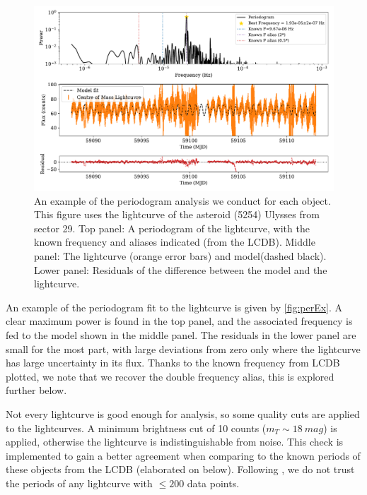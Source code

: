 \documentclass[12pt]{article}
\begin{document}
\begin{figure}[!t]
    \centering
    \includegraphics[width=\textwidth]{PeriodogramUlyssesPaperFigDraft.pdf}
    \caption{An example of the periodogram analysis we conduct for each object.
        This figure uses the lightcurve of the asteroid (5254) Ulysses from sector 29.
        Top panel: A periodogram of the lightcurve, with the known frequency and aliases indicated (from the LCDB).
        Middle panel: The lightcurve (orange error bars) and model(dashed black).
        Lower panel: Residuals of the difference between the model and the lightcurve.}
    \label{fig:perEx}
\end{figure}

An example of the periodogram fit to the lightcurve is given by \autoref{fig:perEx}.
A clear maximum power is found in the top panel, and the associated frequency is fed to the model shown in the middle panel.
The residuals in the lower panel are small for the most part, with large deviations from zero only where the lightcurve has large uncertainty in its flux.
Thanks to the known frequency from LCDB plotted, we note that we recover the double frequency alias, this is explored further below.

Not every lightcurve is good enough for analysis, so some quality cuts are applied to the lightcurves.
A minimum brightness cut of 10 counts ($m_T \sim \qty{18}{mag}$) %
is applied, otherwise the lightcurve is indistinguishable from noise. %
This check is implemented to gain a better agreement when comparing to the known periods of these objects from the LCDB (elaborated on below).
Following \citeauthor{McNeill2023}, we do not trust the periods of any lightcurve with $\leq 200$ data points.
\end{document}
